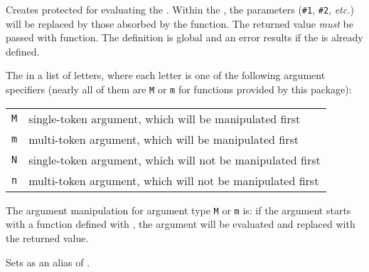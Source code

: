 \documentclass[oneside]{book}
\begin{document}
\begin{function}{\prgNewFunction}
\begin{syntax}
   
\end{syntax}
Creates protected  for evaluating the .
Within the , the parameters (\verb|#1|, \verb|#2|,
\emph{etc.}) will be replaced by those absorbed by the function.
The returned value \emph{must} be passed with  function.
The definition is global and an error results if the
 is already defined.\par
The  in a list of letters,
where each letter is one of the following argument specifiers
(nearly all of them are \texttt{M} or \texttt{m} for functions provided by this package):\par
{\centering\begin{tabular}{ll}
  \texttt{M} & single-token argument, which will be manipulated first \\
  \texttt{m} & multi-token argument, which will be manipulated first \\
  \texttt{N} & single-token argument, which will not be manipulated first \\
  \texttt{n} & multi-token argument, which will not be manipulated first \\
\end{tabular}\par}
The argument manipulation for argument type \texttt{M} or \texttt{m}
is: if the argument starts with a function defined with ,
the argument will be evaluated and replaced with the returned value.
\end{function}

\begin{function}{\prgSetEqFunction}
\begin{syntax}
  
\end{syntax}
Sets  as an alias of .
\end{function}
\end{document}
